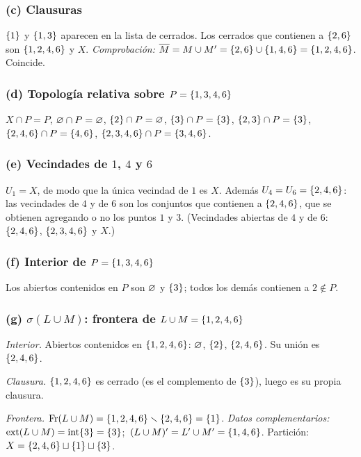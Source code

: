 \subsubsection*{(c) Clausuras}
$\{1\}$ y $\{1,3\}$ aparecen en la lista de cerrados. Los cerrados que contienen a $\{2,6\}$ son $\{1,2,4,6\}$ y $X$.
\emph{Comprobación:} $\overline{M}=M\cup M'=\{2,6\}\cup\{1,4,6\}=\{1,2,4,6\}$. Coincide.

\subsubsection*{(d) Topología relativa sobre $P=\{1,3,4,6\}$}
$X\cap P=P$, $\varnothing\cap P=\varnothing$, $\{2\}\cap P=\varnothing$, $\{3\}\cap P=\{3\}$, $\{2,3\}\cap P=\{3\}$,
$\{2,4,6\}\cap P=\{4,6\}$, $\{2,3,4,6\}\cap P=\{3,4,6\}$.

\subsubsection*{(e) Vecindades de $1$, $4$ y $6$}
$U_1=X$, de modo que la única vecindad de $1$ es $X$. Además $U_4=U_6=\{2,4,6\}$: las vecindades de $4$ y de $6$ son
los conjuntos que contienen a $\{2,4,6\}$, que se obtienen agregando o no los puntos $1$ y $3$.
(Vecindades abiertas de $4$ y de $6$: $\{2,4,6\}$, $\{2,3,4,6\}$ y $X$.)

\subsubsection*{(f) Interior de $P=\{1,3,4,6\}$}
Los abiertos contenidos en $P$ son $\varnothing$ y $\{3\}$; todos los demás contienen a $2\notin P$.

\subsubsection*{(g) $\sigma(L\cup M)$: frontera de $L\cup M=\{1,2,4,6\}$}
\emph{Interior.} Abiertos contenidos en $\{1,2,4,6\}$: $\varnothing$, $\{2\}$, $\{2,4,6\}$. Su unión es $\{2,4,6\}$.

\emph{Clausura.} $\{1,2,4,6\}$ es cerrado (es el complemento de $\{3\}$), luego es su propia clausura.

\emph{Frontera.} $\operatorname{Fr}(L\cup M)=\{1,2,4,6\}\smallsetminus\{2,4,6\}=\{1\}$.
\emph{Datos complementarios:} $\operatorname{ext}(L\cup M)=\operatorname{int}\{3\}=\{3\}$;\ $(L\cup M)'=L'\cup M'=\{1,4,6\}$. Partición:
$X=\{2,4,6\}\sqcup\{1\}\sqcup\{3\}$.

